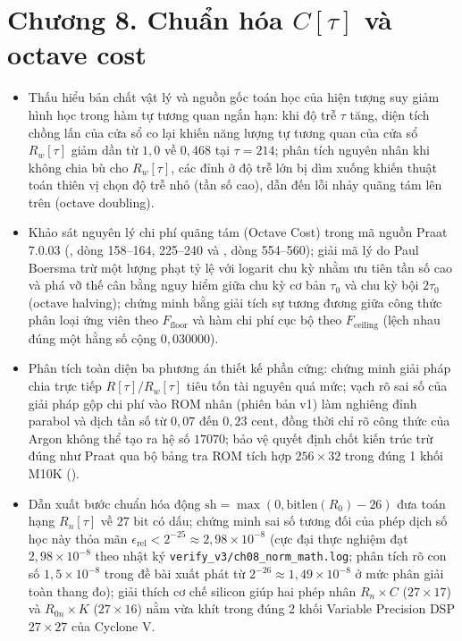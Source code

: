 \providecommand{\todo}[1]{\textcolor{red}{\textbf{[TODO: #1]}}}
\clearpage
{}
\section*{Chương 8. Chuẩn hóa $C[\tau]$ và octave cost}

\begin{learningobj}
\begin{itemize}[leftmargin=1.5em, itemsep=2pt]
    \item Thấu hiểu bản chất vật lý và nguồn gốc toán học của hiện tượng suy giảm hình học trong hàm tự tương quan ngắn hạn: khi độ trễ $\tau$ tăng, diện tích chồng lấn của cửa sổ co lại khiến năng lượng tự tương quan của cửa sổ $R_w[\tau]$ giảm dần từ $1{,}0$ về $0{,}468$ tại $\tau = 214$; phân tích nguyên nhân khi không chia bù cho $R_w[\tau]$, các đỉnh ở độ trễ lớn bị dìm xuống khiến thuật toán thiên vị chọn độ trễ nhỏ (tần số cao), dẫn đến lỗi nhảy quãng tám lên trên (octave doubling).
    \item Khảo sát nguyên lý chi phí quãng tám (Octave Cost) trong mã nguồn Praat 7.0.03 (, dòng 158--164, 225--240 và , dòng 554--560); giải mã lý do Paul Boersma trừ một lượng phạt tỷ lệ với logarit chu kỳ nhằm ưu tiên tần số cao và phá vỡ thế cân bằng nguy hiểm giữa chu kỳ cơ bản $\tau_0$ và chu kỳ bội $2\tau_0$ (octave halving); chứng minh bằng giải tích sự tương đương giữa công thức phân loại ứng viên theo $F_{\text{floor}}$ và hàm chi phí cục bộ theo $F_{\text{ceiling}}$ (lệch nhau đúng một hằng số cộng $0{,}030000$).
    \item Phân tích toàn diện ba phương án thiết kế phần cứng: chứng minh giải pháp chia trực tiếp $R[\tau] / R_w[\tau]$ tiêu tốn tài nguyên quá mức; vạch rõ sai số của giải pháp gộp chi phí vào ROM nhân (phiên bản v1) làm nghiêng đỉnh parabol và dịch tần số từ $0{,}07$ đến $0{,}23\text{ cent}$, đồng thời chỉ rõ công thức của Argon không thể tạo ra hệ số $17070$; bảo vệ quyết định chốt kiến trúc trừ đúng như Praat qua bộ bảng tra ROM tích hợp $256 \times 32$ trong đúng 1 khối M10K ().
    \item Dẫn xuất bước chuẩn hóa động $\text{sh} = \max(0, \text{bitlen}(R_0) - 26)$ đưa toán hạng $R_n[\tau]$ về $27\text{ bit}$ có dấu; chứng minh sai số tương đối của phép dịch số học này thỏa mãn $\epsilon_{\text{rel}} < 2^{-25} \approx 2{,}98 \times 10^{-8}$ (cực đại thực nghiệm đạt $2{,}98 \times 10^{-8}$ theo nhật ký \texttt{verify\_v3/ch08\_norm\_math.log}; phân tích rõ con số $1{,}5 \times 10^{-8}$ trong đề bài xuất phát từ $2^{-26} \approx 1{,}49 \times 10^{-8}$ ở mức phân giải toàn thang đo); giải thích cơ chế silicon giúp hai phép nhân $R_n \times C$ ($27 \times 17$) và $R_{0n} \times K$ ($27 \times 16$) nằm vừa khít trong đúng 2 khối Variable Precision DSP $27 \times 27$ của Cyclone V.

\end{itemize}
\end{learningobj}
